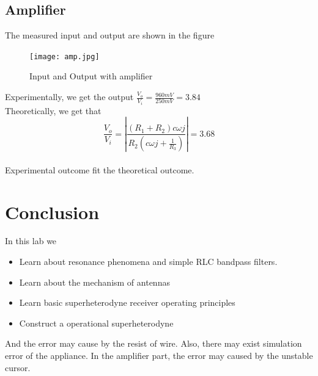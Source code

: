 \documentclass[a4paper]{article}
\begin{document}
    \subsection{Amplifier}
    The measured input and output are shown in the figure\\
    \begin{figure}[H]
        \centering
        \texttt{[image: amp.jpg]}
        \caption{Input and Output with amplifier}
    \end{figure}
    Experimentally, we get the output $\frac{V_o}{V_i}=\frac{960mV}{250mV}=3.84$\\
    Theoretically, we get that $$\frac{V_o}{V_i}=|\frac{(R_1+R_2)c\omega j}{R_2(c\omega j+\frac{1}{R_3})}|=3.68$$\\
    Experimental outcome fit the theoretical outcome.


    \section{Conclusion}
    In this lab we 
    \begin{itemize}
        \item Learn about resonance phenomena and simple RLC bandpass filters.
        \item Learn about the mechanism of antennas
        \item Learn basic superheterodyne receiver operating principles
        \item Construct a operational superheterodyne
    \end{itemize}
    And the error may cause by the resist of wire. Also, there may exist simulation error of the appliance. In the amplifier part, the error may caused by the unstable cursor.
\end{document}
